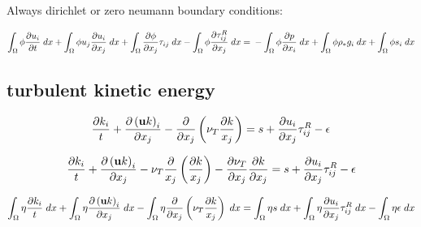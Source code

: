 \documentclass[11pt,a4paper]{article}
\begin{document}
Always dirichlet or zero neumann boundary conditions:

\begin{dmath}
  \int_\Omega \phi \frac{\partial u_i}{\partial t} \; dx + \int_\Omega \phi u_j \frac{\partial u_i}{\partial x_j} \; dx + \int_\Omega \frac{\partial \phi}{\partial x_j} \tau_{ij} \; dx - \int_\Omega \phi \frac{\partial \tau_{ij}^R}{\partial x_j} \; dx = \\ - \int_\Omega \phi \frac{\partial p}{\partial x_i} \; dx + \int_\Omega \phi \rho_* g_i \; dx + \int_\Omega \phi s_i \; dx
\end{dmath}

\subsection{turbulent kinetic energy}

\begin{dmath}
  \frac{\partial k_i}{t} + \frac{\partial \left( {\bf u} k \right)_i}{\partial x_j} - \frac{\partial}{\partial x_j} \left( \nu_T \frac{\partial k}{x_j} \right) = s + \frac{\partial u_i}{\partial x_j} \tau_{ij}^R - \epsilon
\end{dmath}

\begin{dmath}
  \frac{\partial k_i}{t} + \frac{\partial \left( {\bf u} k \right)_i}{\partial x_j} - \nu_T \frac{\partial}{x_j}\left( \frac{\partial k}{x_j} \right) - \frac{\partial \nu_T}{\partial x_j} \frac{\partial k}{\partial x_j} = s + \frac{\partial u_i}{\partial x_j} \tau_{ij}^R - \epsilon
\end{dmath}

\begin{dmath}
  \int_\Omega \eta \frac{\partial k_i}{t} \; dx + \int_\Omega \eta \frac{\partial \left( {\bf u} k \right)_i}{\partial x_j} \; dx - \int_\Omega \eta \frac{\partial}{\partial x_j} \left( \nu_T \frac{\partial k}{x_j} \right) \; dx = \int_\Omega \eta s \; dx + \int_\Omega \eta \frac{\partial u_i}{\partial x_j} \tau_{ij}^R \; dx - \int_\Omega \eta \epsilon \; dx
\end{dmath}


\end{document}
